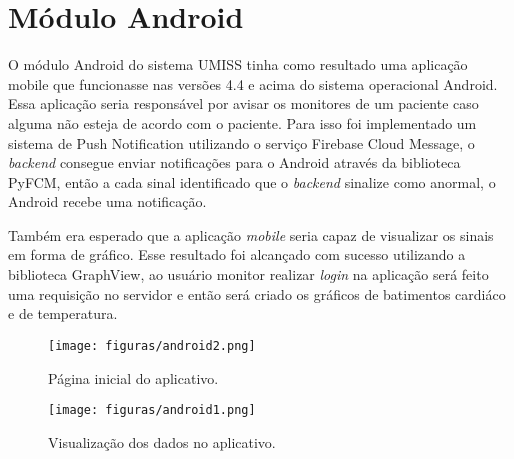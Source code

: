 \section{Módulo Android}

O módulo Android do sistema UMISS tinha como resultado uma aplicação mobile que 
funcionasse nas versões 4.4 e acima do sistema operacional Android. Essa aplicação
seria responsável por avisar os monitores de um paciente caso alguma não esteja de
acordo com o paciente. Para isso foi implementado um sistema de Push Notification
utilizando o serviço Firebase Cloud Message, o \textit{backend} consegue enviar 
notificações para o Android através da biblioteca PyFCM, então a cada sinal identificado
que o \textit{backend} sinalize como anormal, o Android recebe uma notificação.

Também era esperado que a aplicação \textit{mobile} seria capaz de visualizar
os sinais em forma de gráfico. Esse resultado foi alcançado com sucesso utilizando
a biblioteca GraphView, ao usuário monitor realizar \textit{login} na aplicação será
feito uma requisição no servidor e então será criado os gráficos de batimentos cardiáco
e de temperatura.

\begin{figure}[h!]
    \begin{center}
        \texttt{[image: figuras/android2.png]}
    \end{center}
    \caption{Página inicial do aplicativo.}
    \label{fig:android2}
\end{figure}

\begin{figure}[h!]
    \begin{center}
        \texttt{[image: figuras/android1.png]}
    \end{center}
    \caption{Visualização dos dados no aplicativo.}
    \label{fig:android1}
\end{figure}
